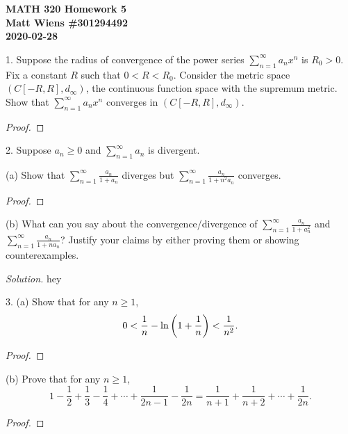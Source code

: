 \documentclass{article}
\begin{document}
\textbf{MATH 320 Homework 5} \\
\textbf{Matt Wiens \#301294492} \\
\textbf{2020-02-28}

1. Suppose the radius of convergence of the power series $\sum_{n =
   1}^\infty a_n x^n$ is $R_0 > 0$. Fix a constant $R$ such that $0 < R
   < R_0$. Consider the metric space $(C[-R, R], d_\infty)$, the
   continuous function space with the supremum metric. Show that
   $\sum_{n = 1}^\infty a_n x^n$ converges in $(C[-R, R], d_\infty)$.

\begin{proof}

\end{proof}

\newpage

2. Suppose $a_n \geq 0$ and $\sum_{n = 1}^\infty a_n$ is divergent.

(a) Show that $\sum_{n = 1}^\infty \frac{a_n}{1 + a_n}$ diverges but
$\sum_{n = 1}^\infty \frac{a_n}{1 + n^2 a_n}$ converges.

\begin{proof}

\end{proof}

(b) What can you say about the convergence/divergence of $\sum_{n =
1}^\infty \frac{a_n}{1 + a_n^2}$ and $\sum_{n = 1}^\infty \frac{a_n}{1 +
n a_n}$? Justify your claims by either proving them or showing
counterexamples.

\textit{Solution.}
hey

\newpage

3. (a) Show that for any $n \geq 1$,
%
\begin{equation}
    0 < \frac{1}{n} - \ln \del{1 + \frac{1}{n}} < \frac{1}{n^2}.
    \label{eq:q3-a}
\end{equation}

\begin{proof}

\end{proof}

(b) Prove that for any $n \geq 1$,
%
\begin{equation}
    1 - \frac{1}{2} + \frac{1}{3} - \frac{1}{4} + \cdots + \frac{1}{2 n - 1} - \frac{1}{2 n}
    = \frac{1}{n + 1} + \frac{1}{n + 2} + \cdots + \frac{1}{2 n}.
    \label{eq:q3-b}
\end{equation}

\begin{proof}

\end{proof}
\end{document}
